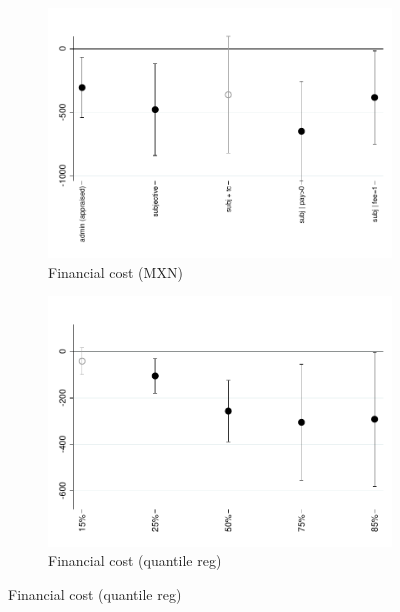 \documentclass[oneside,11pt]{article}
\begin{document}
\begin{figure}[H]
    \caption{The effect of the fee-forcing treatment}
    \label{fc_pro2}
    \begin{center}
    \begin{subfigure}{0.42\textwidth}
        \caption{Financial cost (MXN)}
        \centering
        \includegraphics[width=\textwidth]{Figuras/fc_te_pro_2.pdf}
    \end{subfigure}
        \begin{subfigure}{0.42\textwidth}
        \caption{Financial cost (quantile reg)}
        \centering
        \includegraphics[width=\textwidth]{Figuras/fc_quantile_pro_2.pdf}
    \end{subfigure}
    
        \bigskip
    

\end{center}
\end{figure}
\end{document}
